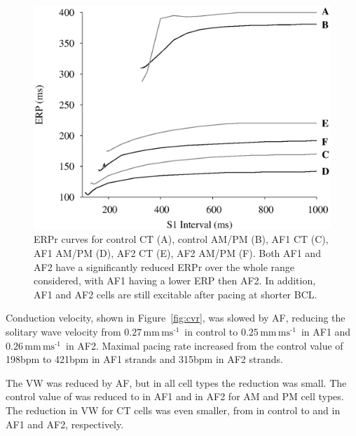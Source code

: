 \begin{figure}[tb]
\centering
\includegraphics{figures/toolkit/afer/3_erpr}
\caption[AFER ERPr curves]{ERPr curves for control CT (A), control AM/PM (B), AF1 CT (C),
AF1 AM/PM (D), AF2 CT (E), AF2 AM/PM (F).  Both AF1 and AF2 have a
significantly reduced ERPr over the whole range considered, with AF1
having a lower ERP then AF2.  In addition, AF1 and AF2 cells are still
excitable after pacing at  shorter BCL.}
\label{fig:erpr}
\end{figure}

Conduction velocity, shown in Figure~\ref{fig:cvr}, was slowed by AF,
reducing the solitary wave velocity from $0.27\,\text{mm}\,\text{ms}^{\text{-1}}$\ in
control to $0.25\,\text{mm}\,\text{ms}^{\text{-1}}$\ in AF1 and
$0.26\,\text{mm}\,\text{ms}^{\text{-1}}$\ in
AF2.  Maximal pacing rate increased from the control value of \unit{198}{bpm} to
\unit{421}{bpm} in AF1 strands and \unit{315}{bpm} in AF2 strands.

The VW was reduced by AF, but in all cell types the reduction was small.
The control value of  was reduced to  in AF1 and 
in AF2 for AM and PM cell types.  The reduction in VW for CT cells was
even smaller, from  in control to  and  in AF1 and
AF2, respectively.

